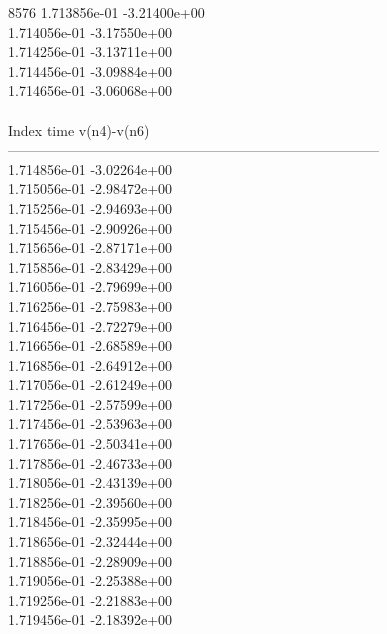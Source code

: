 8576	1.713856e-01	-3.21400e+00	\\ 	1.714056e-01	-3.17550e+00	\\ 	1.714256e-01	-3.13711e+00	\\ 	1.714456e-01	-3.09884e+00	\\ 	1.714656e-01	-3.06068e+00	\\ \hline
\\ \hline
Index   time            v(n4)-v(n6)     \\ \hline
--------------------------------------------------------------------------------\\ 	1.714856e-01	-3.02264e+00	\\ 	1.715056e-01	-2.98472e+00	\\ 	1.715256e-01	-2.94693e+00	\\ 	1.715456e-01	-2.90926e+00	\\ 	1.715656e-01	-2.87171e+00	\\ 	1.715856e-01	-2.83429e+00	\\ 	1.716056e-01	-2.79699e+00	\\ 	1.716256e-01	-2.75983e+00	\\ 	1.716456e-01	-2.72279e+00	\\ 	1.716656e-01	-2.68589e+00	\\ 	1.716856e-01	-2.64912e+00	\\ 	1.717056e-01	-2.61249e+00	\\ 	1.717256e-01	-2.57599e+00	\\ 	1.717456e-01	-2.53963e+00	\\ 	1.717656e-01	-2.50341e+00	\\ 	1.717856e-01	-2.46733e+00	\\ 	1.718056e-01	-2.43139e+00	\\ 	1.718256e-01	-2.39560e+00	\\ 	1.718456e-01	-2.35995e+00	\\ 	1.718656e-01	-2.32444e+00	\\ 	1.718856e-01	-2.28909e+00	\\ 	1.719056e-01	-2.25388e+00	\\ 	1.719256e-01	-2.21883e+00	\\ 	1.719456e-01	-2.18392e+00	\\ \hline
